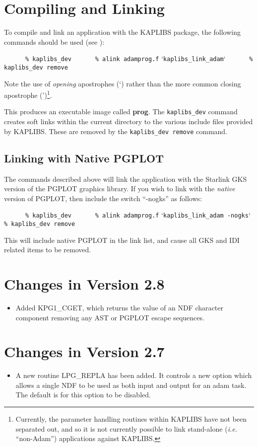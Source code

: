 \section{Compiling and Linking}
To compile and link an application with the KAPLIBS package, the following
commands should be used (see ):

\small
\verb#      % kaplibs_dev#
\verb#      % alink adamprog.f# `\verb#kaplibs_link_adam#`
\verb#      % kaplibs_dev remove#
\normalsize

Note the use of {\em opening} apostrophes (`) rather than the more common
closing apostrophe (')\footnote{Currently, the parameter handling
routines within KAPLIBS have not been separated out, and so it is not
currently possible to link stand-alone (\emph{i.e.} ``non-Adam'')
applications against KAPLIBS.}.

This produces an executable image called {\bf prog}. The
\verb+kaplibs_dev+ command creates soft links within the current
directory to the various include files provided by KAPLIBS. These are
removed by the \verb+kaplibs_dev remove+ command.

\subsection{Linking with Native PGPLOT}
The commands described above will link the application with the Starlink
GKS version of the PGPLOT graphics library. If you wish to link with the
{\em native} version of PGPLOT, then include the switch ``-nogks'' as follows:

\small
\verb#      % kaplibs_dev#
\verb#      % alink adamprog.f# `\verb#kaplibs_link_adam -nogks#`
\verb#      % kaplibs_dev remove#
\normalsize

This will include native PGPLOT in the link list, and cause all GKS and IDI 
related items to be removed.



\section{Changes in Version 2.8}
\begin{itemize}
\item Added KPG1\_CGET, which returns the value of an NDF character 
     component removing any AST or PGPLOT escape sequences.
\end{itemize}

\section{Changes in Version 2.7}
\begin{itemize}
\item A new routine LPG\_REPLA has been added. It controls a new option
   which allows a single NDF to be used as both input and output for an adam task. 
   The default is for this option to be disabled.
\end{itemize}

